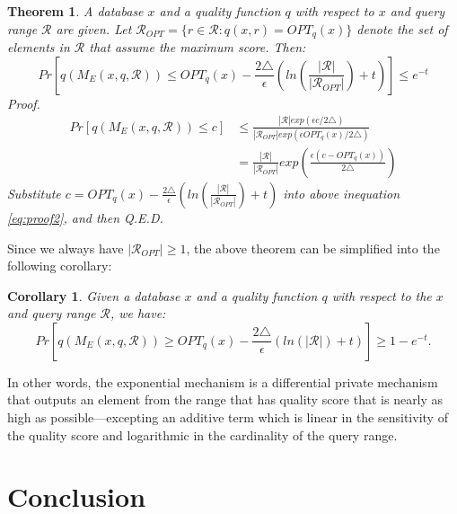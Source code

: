 \documentclass[a4paper, 11pt]{article} %
\newtheorem{theorem}{Theorem}
\newtheorem{corollary}{Corollary}[theorem]
\theoremstyle{definition}
\begin{document}
\begin{theorem}
A database $x$ and a quality function $q$ with respect to $x$ and query range $\mathcal{R}$ are given. Let $\mathcal{R}_{OPT} =\{r \in \mathcal{R}: q(x, r) = OPT_q(x) \}$ denote the set of elements in $\mathcal{R}$ that assume the maximum score. Then:
\begin{equation}
Pr \left[q(M_E(x, q, \mathcal{R}))  
\leq OPT_q(x) - \frac{2\triangle}{\epsilon} 
\left(   
ln \left( \frac{|\mathcal{R}|}{|\mathcal{R}_{OPT}|} \right) + t
\right) \right]
 \leq e^{-t}
\end{equation}
\textit{Proof. }
\begin{align}  \label{eq:proof2}
Pr[q(M_E(x, q, \mathcal{R})) \leq c] 
& \leq \frac{
|\mathcal{R}| exp(\epsilon c / 2 \triangle)
}{
|\mathcal{R}_{OPT}| exp(\epsilon OPT_q(x) / 2 \triangle)
} \\
&= \frac{|\mathcal{R}| }{ | \mathcal{R}_{OPT} | }
exp(
\frac{\epsilon ( c - OPT_q(x)  ) }{2 \triangle}
)
\end{align}
Substitute $c = OPT_q(x) - \frac{2\triangle}{\epsilon} 
\left(   
ln \left( \frac{|\mathcal{R}|}{|\mathcal{R}_{OPT}|} \right) + t
\right)
$ into above inequation \ref{eq:proof2}, and then Q.E.D.
\end{theorem}
Since we always have $|\mathcal{R}_{OPT}| \geq 1$, the above theorem can be simplified into the following corollary:
\begin{corollary}
Given a database $x$ and a quality function $q$ with respect to the $x$ and query range $\mathcal{R}$, we have:
\begin{equation}
Pr[q(M_E(x, q, \mathcal{R}))  \geq  
OPT_q(x) - \frac{2 \triangle}{\epsilon} (ln(| \mathcal{R}|) + t)]
\geq 1-e^{-t}.
\end{equation}
\end{corollary}
In other words, the exponential mechanism is a differential private mechanism that outputs an element from the range that has quality score that is nearly as high as possible---excepting an additive term which is linear in the sensitivity of the quality score and logarithmic in the cardinality of the query range.








\section*{Conclusion}










\end{document}
